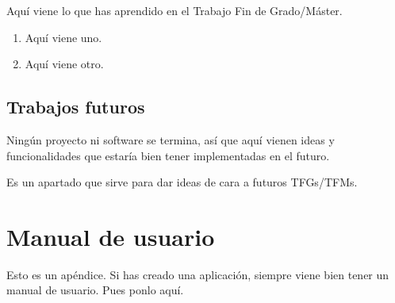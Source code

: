 \documentclass[a4paper, 12pt]{book}
\let\cleardoublepage\clearpage
\begin{document}
Aquí viene lo que has aprendido en el Trabajo Fin de Grado/Máster.

\begin{enumerate}
  \item Aquí viene uno.
  \item Aquí viene otro.
\end{enumerate}


\section{Trabajos futuros}
\label{sec:trabajos_futuros}

Ningún proyecto ni software se termina, así que aquí vienen ideas y funcionalidades que estaría bien tener implementadas en el futuro.

Es un apartado que sirve para dar ideas de cara a futuros TFGs/TFMs.



\cleardoublepage
\appendix
\chapter{Manual de usuario}
\label{app:manual}

Esto es un apéndice.
Si has creado una aplicación, siempre viene bien tener un manual de usuario.
Pues ponlo aquí.


\cleardoublepage


\end{document}
